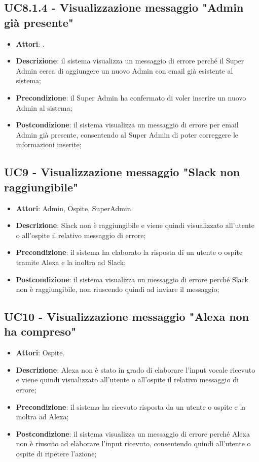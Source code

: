 \documentclass[../AnalisiDeiRequisiti.tex]{subfiles}
\begin{document}
\subsection{UC8.1.4 - Visualizzazione messaggio "Admin già presente"} 
\label{sssec:UC8.1.4} 
\begin{itemize} 
\item \textbf{Attori}: .
\item \textbf{Descrizione}: il sistema visualizza un messaggio di errore perché il Super Admin cerca di aggiungere un nuovo Admin con email già esistente al sistema;
\item \textbf{Precondizione}: il Super Admin ha confermato di voler inserire un nuovo Admin al sistema;
\item \textbf{Postcondizione}: il sistema visualizza un messaggio di errore per email Admin già presente, consentendo al Super Admin di poter correggere le informazioni inserite;
\end{itemize} 
\subsection{UC9 - Visualizzazione messaggio "Slack non raggiungibile"} 
\label{sssec:UC9} 
\begin{itemize} 
\item \textbf{Attori}: Admin, Ospite, SuperAdmin.
\item \textbf{Descrizione}: Slack non è raggiungibile e viene quindi visualizzato all'utente o all'ospite il relativo messaggio di errore;
\item \textbf{Precondizione}: il sistema ha elaborato la risposta di un utente o ospite tramite Alexa e la inoltra ad Slack;
\item \textbf{Postcondizione}: il sistema visualizza un messaggio di errore perché Slack non è raggiungibile, non riuscendo quindi ad inviare il messaggio;
\end{itemize} 
\subsection{UC10 - Visualizzazione messaggio "Alexa non ha compreso"} 
\label{sssec:UC10} 
\begin{itemize} 
\item \textbf{Attori}: Ospite.
\item \textbf{Descrizione}: Alexa non è stato in grado di elaborare l'input vocale ricevuto e viene quindi visualizzato all'utente o all'ospite il relativo messaggio di errore;
\item \textbf{Precondizione}: il sistema ha ricevuto risposta da un utente o ospite e la inoltra ad Alexa;
\item \textbf{Postcondizione}: il sistema visualizza un messaggio di errore perché Alexa non è riuscito ad elaborare l'input ricevuto, consentendo quindi all'utente o ospite di ripetere l'azione;
\end{itemize} 
\end{document}
